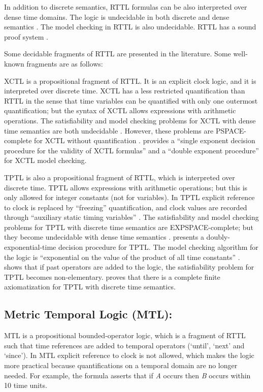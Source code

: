 \documentclass[11pt]{article}
\begin{document}
In addition to  discrete semantics, RTTL formulas can be also interpreted over dense time domains. The logic is undecidable in both discrete and dense semantics \cite{AH90}. The model checking in RTTL is also undecidable. RTTL has a sound proof system \cite{Ost89}.

Some decidable fragments of RTTL are presented in the literature. Some well-known fragments are as follows:

XCTL \cite{HLP90} is a propositional fragment of RTTL. It is an explicit clock logic, and it is interpreted over discrete time. XCTL has a less restricted quantification than RTTL in the sense that time variables can be quantified with only one outermost quantification; but the syntax of XCTL allows expressions with arithmetic operations. The satisfiability and model checking problems for XCTL with dense time semantics are both undecidable  \cite{HLP90}. However, these problems are PSPACE-complete for XCTL without quantification \cite{HLP90}. \cite{HLP90} provides a ``single exponent decision procedure for the validity of XCTL formulas'' and a ``double exponent procedure'' for XCTL model checking. 

TPTL \cite{AH90} is also a propositional fragment of RTTL, which is interpreted over discrete time. TPTL allows expressions with arithmetic operations; but this is only allowed for integer constants (not for variables). In TPTL explicit reference to clock is replaced by ``freezing'' quantification, and clock values are recorded through ``auxiliary static timing variables'' \cite{Ost92}.  The satisfiability and model checking problems for TPTL with discrete time semantics are EXPSPACE-complete; but they become undecidable with dense time semantics \cite{AH89}. \cite{AH89} presents a doubly-exponential-time decision procedure for TPTL. The model checking algorithm for the logic is ``exponential on the value of the product of all time constants'' \cite{Ost92}. \cite{AH90} shows that if past operators are added to the logic, the satisfiability problem for TPTL becomes non-elementary.  \cite{Hen91} proves that there is a complete finite axiomatization for TPTL with discrete time semantics.

\subsection{Metric Temporal Logic (MTL): }

MTL \cite{Koy90} is a propositional bounded-operator logic, which is a fragment of RTTL such that time references are added to temporal operators (`until', `next' and `since'). In MTL explicit reference to clock is not allowed, which makes the logic more practical because quantifications on a temporal domain are no longer needed. For example, the formula  asserts that if \emph{A} occurs then \emph{B} occurs within 10 time units. 
\end{document}
